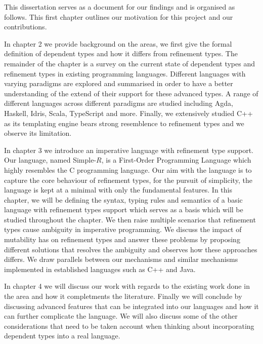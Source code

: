 \documentclass[a4paper,12pt]{report}
\begin{document}
\par
This dissertation serves as a document for our findings and is organised as 
follows. This first chapter outlines our motivation for this project and our 
contributions. 

\par
In chapter 2 we provide background on the areas, we first give the 
formal definition of dependent types and how it differs from refinement types. 
The remainder of the chapter is a survey on the current state of 
dependent types and refinement types in existing programming languages. 
Different languages with varying paradigms are explored 
and summarised in order to have a better understanding of the extend of their 
support for these advanced types. A range of different languages across different 
paradigms are studied including Agda, Haskell, Idris, Scala, 
TypeScript and more. Finally, we extensively studied C++ as its templating 
engine bears strong resemblence to refinement types and we observe its limitation. 

\par
In chapter 3 we introduce an imperative language with refinement type support. 
Our language, named Simple-$R$, is a First-Order Programming Language which 
highly resembles the C programming language. Our aim with the language is to 
capture the core behaviour of refinement types, for the pursuit 
of simplicity, the language is kept at a minimal with only the fundamental features. 
In this chapter, we will be defining the syntax, typing rules and semantics 
of a basic language with refinement types support which serves as a basis 
which will be studied throughout the chapter. We then raise 
multiple scenarios that refinement types cause ambiguity in imperative programming. 
We discuss the impact of mutability has on refinement types and 
answer these problems by proposing different solutions that resolves the 
ambiguity and observes how these approaches differs. We draw parallels between 
our mechanisms and similar mechanisms implemented in established languages such 
as C++ and Java. 

\par
In chapter 4 we will discuss our work with regards to the 
existing work done in the area and how it completments the literature.
Finally we will conclude by discussing advanced features that can be integrated 
into our languages and how it can further complicate the language. We will also 
discuss some of the other considerations that need to be taken account when 
thinking about incorporating dependent types into a real language. 
\end{document}
